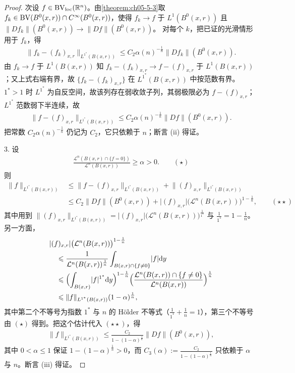 ﻿\documentclass[../../main.tex]{subfiles}%
\begin{document}
\begin{proof}
次设 $f\in\mathrm{BV}_{\mathrm{loc}}(\mathbb{R}^n)$。由\cref{theorem:ch05-5-3}取 $f_k\in\mathrm{BV}(B^0(x,r))\cap C^\infty(B^0(x,r))$，使得 $f_k\to f$ 于 $L^1(B^0(x,r))$ 且 $\lVert Df_k\rVert(B^0(x,r))\to\lVert Df\rVert(B^0(x,r))$。%
对每个 $k$，把已证的光滑情形用于 $f_k$，得
\begin{align*}
\lVert f_k-(f_k)_{x,r}\rVert_{L^{1^*}(B(x,r))}\leqslant C_2\alpha(n)^{-\frac1n}\lVert Df_k\rVert(B^0(x,r)).
\end{align*}
由 $f_k\to f$ 于 $L^1(B(x,r))$ 知 $f_k-(f_k)_{x,r}\to f-(f)_{x,r}$ 于 $L^1(B(x,r))$；又上式右端有界，故 $\{f_k-(f_k)_{x,r}\}$ 在 $L^{1^*}(B(x,r))$ 中按范数有界。$1^*>1$ 时 $L^{1^*}$ 为自反空间，故该列存在弱收敛子列，其弱极限必为 $f-(f)_{x,r}$；$L^{1^*}$ 范数弱下半连续，故
\begin{align*}
\lVert f-(f)_{x,r}\rVert_{L^{1^*}(B(x,r))}\leqslant C_2\alpha(n)^{-\frac1n}\lVert Df\rVert(B^0(x,r)).
\end{align*}
把常数 $C_2\alpha(n)^{-\frac1n}$ 仍记为 $C_2$，它只依赖于 $n$；断言 (ii) 得证。

3. 设
\begin{align*}
\frac{\mathcal{L}^n(B(x,r)\cap\{f=0\})}{\mathcal{L}^n(B(x,r))}\geqslant\alpha>0. \qquad(\star)
\end{align*}
则
\begin{align*}
\lVert f\rVert_{L^{1^*}(B(x,r))}
&\leqslant\lVert f-(f)_{x,r}\rVert_{L^{1^*}(B(x,r))}+\lVert(f)_{x,r}\rVert_{L^{1^*}(B(x,r))}\\
&\leqslant C_2\lVert Df\rVert(B^0(x,r))+\lvert(f)_{x,r}\rvert\bigl(\mathcal{L}^n(B(x,r))\bigr)^{1-\frac1n},\qquad(\star\star)
\end{align*}
其中用到 $\lVert(f)_{x,r}\rVert_{L^{1^*}(B(x,r))}=\lvert(f)_{x,r}\rvert\bigl(\mathcal{L}^n(B(x,r))\bigr)^{\frac{1}{1^*}}$ 与 $\frac{1}{1^*}=1-\frac1n$。另一方面，
\begin{align*}
&\lvert(f)_{x,r}\rvert\bigl(\mathcal{L}^n(B(x,r))\bigr)^{1-\frac1n}\\
&\quad\leqslant\frac{1}{\mathcal{L}^n(B(x,r))^{\frac1n}}\int_{B(x,r)\cap\{f\neq0\}}\lvert f\rvert\mathrm{d} y\\
&\quad\leqslant\Bigl(\int_{B(x,r)}\lvert f\rvert^{1^*}\mathrm{d} y\Bigr)^{1-\frac1n}\Bigl(\frac{\mathcal{L}^n(B(x,r))\cap\{f\neq0\}}{\mathcal{L}^n(B(x,r))}\Bigr)^{\frac1n}\\
&\quad\leqslant\lVert f\rVert_{L^{1^*}(B(x,r))}(1-\alpha)^{\frac1n},
\end{align*}
其中第二个不等号为指数 $1^*$ 与 $n$ 的 Hölder 不等式（$\frac{1}{1^*}+\frac1n=1$），第三个不等号由 $(\star)$ 得到。把这个估计代入 $(\star\star)$，得
\begin{align*}
\lVert f\rVert_{L^{1^*}(B(x,r))}\leqslant\frac{C_2}{1-(1-\alpha)^{\frac1n}}\lVert Df\rVert(B^0(x,r)),
\end{align*}
其中 $0<\alpha\leqslant1$ 保证 $1-(1-\alpha)^{\frac1n}>0$，而 $C_3(\alpha):=\frac{C_2}{1-(1-\alpha)^{\frac1n}}$ 只依赖于 $\alpha$ 与 $n$。断言 (iii) 得证。
\end{proof}
\end{document}
